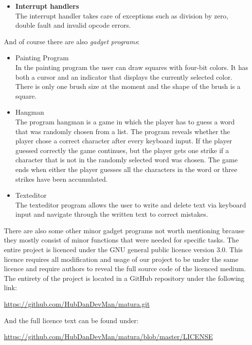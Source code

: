 \begin{itemize}
\item \textbf{Interrupt handlers} \\
The interrupt handler takes care of exceptions such as division by zero, double fault
and invalid opcode errors.


\end{itemize}

And of course there are also \textit{gadget programs}:

\begin{itemize}

\item Painting Program \\
In the painting program the user can draw squares with four-bit colors. It has both a cursor and an indicator 
that displays the currently selected color. There is only one brush size at the moment and the
shape of the brush is a square.

\item Hangman \\
The program hangman is a game in which the player has to guess a word that was randomly chosen from a list. The program 
reveals whether the player chose a correct character after every keyboard input. If the player guessed correctly
the game continues, but the player gets one strike if a character that is not in the randomly selected word 
was chosen. The game ends when either the player guesses all the characters in the word or three strikes have
been accumulated.

\item Texteditor \\
The texteditor program allows the user to write and delete text via keyboard input and navigate through the written 
text to correct mistakes.

\end{itemize}



There are also some other minor gadget programs not worth mentioning brcause they mostly consist of minor functions 
that were needed for specific tasks. The entire project is licenced under the GNU general public licence version 
3.0. This licence requires all modification and usage of our project to be under the same licence and 
require authors to reveal the full source code of the licenced medium. The entirety of the project is located
in a GitHub repository under the following link:

\url{https://github.com/HubDanDevMan/matura.git}

And the full licence text can be found under:

\url{https://github.com/HubDanDevMan/matura/blob/master/LICENSE}
